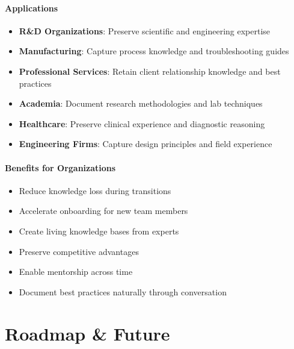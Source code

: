 \documentclass[11pt,letterpaper]{article}
\begin{document}
\paragraph{Applications}
\begin{itemize}[leftmargin=*]
    \item \textbf{R\&D Organizations}: Preserve scientific and engineering expertise
    \item \textbf{Manufacturing}: Capture process knowledge and troubleshooting guides
    \item \textbf{Professional Services}: Retain client relationship knowledge and best practices
    \item \textbf{Academia}: Document research methodologies and lab techniques
    \item \textbf{Healthcare}: Preserve clinical experience and diagnostic reasoning
    \item \textbf{Engineering Firms}: Capture design principles and field experience
\end{itemize}

\paragraph{Benefits for Organizations}
\begin{itemize}[leftmargin=*]
    \item Reduce knowledge loss during transitions
    \item Accelerate onboarding for new team members
    \item Create living knowledge bases from experts
    \item Preserve competitive advantages
    \item Enable mentorship across time
    \item Document best practices naturally through conversation
\end{itemize}

\newpage
\section{Roadmap \& Future}
\end{document}
